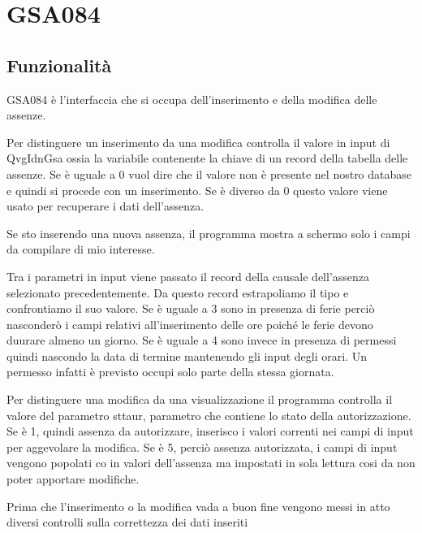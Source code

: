 \documentclass[target=bach,aauheader=,style=]{thud}
\begin{document}
\section{GSA084}
\subsection{Funzionalità}
GSA084 è l'interfaccia che si occupa dell'inserimento e della modifica delle assenze.

Per distinguere un inserimento da una modifica controlla il valore in input di QvgIdnGsa ossia la variabile contenente la chiave di un record della tabella delle assenze.
Se è uguale a 0 vuol dire che il valore non è presente nel nostro database e quindi si procede con un inserimento.
Se è diverso da 0 questo valore viene usato per recuperare i dati dell'assenza.

Se sto inserendo una nuova assenza, il programma mostra a schermo solo i campi da compilare di mio interesse.

Tra i parametri in input viene passato il record della causale dell'assenza selezionato precedentemente. Da questo record estrapoliamo il tipo e confrontiamo il suo valore.
Se è uguale a 3 sono in presenza di ferie perciò nasconderò i campi relativi all'inserimento delle ore poiché le ferie devono duurare almeno un giorno.
Se è uguale a 4 sono invece in presenza di permessi quindi nascondo la data di termine mantenendo gli input degli orari. Un permesso infatti è previsto occupi solo parte della stessa giornata.


Per distinguere una modifica da una visualizzazione il programma controlla il valore del parametro sttaur, parametro che contiene lo stato della autorizzazione.
Se è 1, quindi assenza da autorizzare, inserisco i valori correnti nei campi di input per aggevolare la modifica.
Se è 5, perciò assenza autorizzata, i campi di input vengono popolati co in valori dell'assenza ma impostati in sola lettura cosi da non poter apportare modifiche.

Prima che l'inserimento o la modifica vada a buon fine vengono messi in atto diversi controlli sulla correttezza dei dati inseriti
\end{document}
